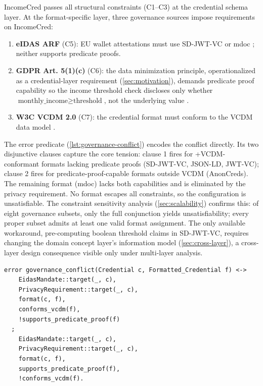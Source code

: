 IncomeCred passes all structural constraints (C1--C3) at the credential schema layer. At the format-specific layer, three governance sources impose requirements on IncomeCred:

\begin{enumerate}
\def\labelenumi{\arabic{enumi}.}
\tightlist
\item
  \textbf{eIDAS ARF} (C5): EU wallet attestations must use SD-JWT-VC or mdoc \citep{noauthor_eu-digital-identity-walleteudi-doc-architecture-and-reference-framework_2026}; neither supports predicate proofs.
\item
  \textbf{\ac{GDPR} Art. 5(1)(c)} (C6): the data minimization principle, operationalized as a credential-layer requirement (\autoref{sec:motivation}), demands predicate proof capability so the income threshold check discloses only whether \(\text{monthly\_income} \geq \text{threshold}\), not the underlying value \citep{gdpr}.
\item
  \textbf{W3C VCDM 2.0} (C7): the credential format must conform to the \ac{VCDM} data model \citep{sporny_verifiable_2025, curran2022anoncreds}.
\end{enumerate}

The  error predicate (\autoref{lst:governance-conflict}) encodes the conflict directly. Its two disjunctive clauses capture the core tension: clause 1 fires for +VCDM-conformant formats lacking predicate proofs (SD-JWT-VC, JSON-LD, JWT-VC); clause 2 fires for predicate-proof-capable formats outside \ac{VCDM} (AnonCreds). The remaining format (mdoc) lacks both capabilities and is eliminated by the privacy requirement. No format escapes all constraints, so the configuration is unsatisfiable. The constraint sensitivity analysis (\autoref{sec:scalability}) confirms this: of eight governance subsets, only the full conjunction yields unsatisfiability; every proper subset admits at least one valid format assignment. The only available workaround, pre-computing boolean threshold claims in SD-JWT-VC, requires changing the domain concept layer's information model (\autoref{sec:cross-layer}), a cross-layer design consequence visible only under multi-layer analysis.

\begin{lstlisting}[style=refinery, caption={Governance conflict: no format satisfies eIDAS, privacy, and VCDM simultaneously}, label=lst:governance-conflict]
error governance_conflict(Credential c, Formatted_Credential f) <->
    EidasMandate::target(_, c),
    PrivacyRequirement::target(_, c),
    format(c, f),
    conforms_vcdm(f),
    !supports_predicate_proof(f)
  ;
    EidasMandate::target(_, c),
    PrivacyRequirement::target(_, c),
    format(c, f),
    supports_predicate_proof(f),
    !conforms_vcdm(f).
\end{lstlisting}

